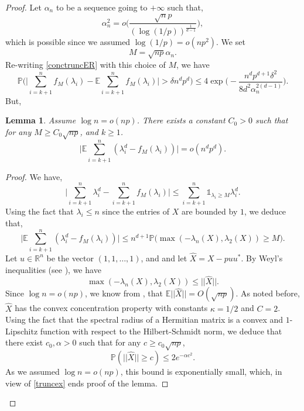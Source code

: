 \documentclass[aop,preprint]{imsart}
\newcommand\RR{\mathbb{R}}
\newcommand\PP{\mathbb{P}}
\newcommand\EE{\mathbb{E}}
\newcommand\Car{\mathds{1}}
\numberwithin{equation}{section}
\theoremstyle{definition}
\theoremstyle{plain}
\newtheorem{Lem}[Def]{Lemma}
\theoremstyle{remark}
\begin{document}
\begin{proof}
Let $\alpha_ n$ to be a sequence going to $+\infty$ such that,
\begin{equation}\label{defalpha} \alpha_n^2 = o\Big( \frac{\sqrt{n} p}{(\log  (1/p))^{\frac{1}{d-1}}}\Big),\end{equation}
which is possible since we assumed $\log(1/p)= o(np^2)$.
We set
 \begin{equation} \label{defM} M = \sqrt{np}\alpha_n.\end{equation} 
 Re-writing \eqref{conctruncER} with this choice of $M$, we have
\begin{equation} \label{alpha} \PP\Big( \big|\sum_{i=k+1}^{n} f_M(\lambda_i)-\EE \sum_{i=k+1}^{n} f_M(\lambda_i) \big| >\delta n^dp^d \Big) \leq 4\exp\Big( - \frac{ n^{d}p^{d+1}\delta^2}{ 8 d^2\alpha_n^{2(d-1)} }\Big).\end{equation}
 But,
\begin{Lem}\label{expectrun} Assume $\log n = o(np)$. There exists a constant $C_0>0$ such that for any $M\geq C_0 \sqrt{np}$, and $k\geq 1$.
$$
\big| \EE \sum_{i=k+1}^{n} ( \lambda_i^d-f_M(\lambda_i))\big| =o(n^dp^d).
$$
\end{Lem}
\begin{proof}
We have,
$$ \big |  \sum_{i=k+1}^n \lambda_i^d- \sum_{i=k+1}^{n} f_M(\lambda_i)\big | \leq \sum_{i=k+1}^n \Car_{\lambda_i\geq M} \lambda_i^d.$$
Using the fact that $\lambda_i\leq n$ since the entries of $X$ are bounded by $1$, we deduce that,
\begin{equation} \label{truncex} \big |  \EE \sum_{i=k+1}^{n} (  \lambda_i^d-f_M(\lambda_i))\big |\leq n^{d+1} \PP\big( \max(- \lambda_n(X), \lambda_2(X)) \geq M\big).\end{equation}
Let $u\in\RR^n$ be the vector $(1,1,\ldots,1)$, and and let $\hat X = X - p u u^*$. By Weyl's inequalities (see \cite[Theorem III.2.1]{Bhatia}), we have 
$$ \max(- \lambda_n(X), \lambda_2(X)) \leq || \hat X||.$$
Since $\log n =o(np)$, we know from \cite[Example 4.10]{LHY}, that $\EE || \hat X|| =O(\sqrt{np})$. As noted before, $\hat X$ has the convex concentration property with constants $\kappa =1/2$ and $C=2$. Using the fact that the spectral radius of a Hermitian matrix is a convex and $1$-Lipschitz function with respect to the Hilbert-Schmidt norm, we deduce that there exist $c_0, \alpha>0$ such that for any $c\geq c_0 \sqrt{np}$,
\begin{equation} \label{tailsp}\PP( || \hat X || \geq c) \leq 2e^{-\alpha c^2}.\end{equation}
As we assumed $\log n =o(np)$, this bound is exponentially small, which, in view of \eqref{truncex} ends proof of the lemma.

\end{proof}
\end{proof}
\end{document}

